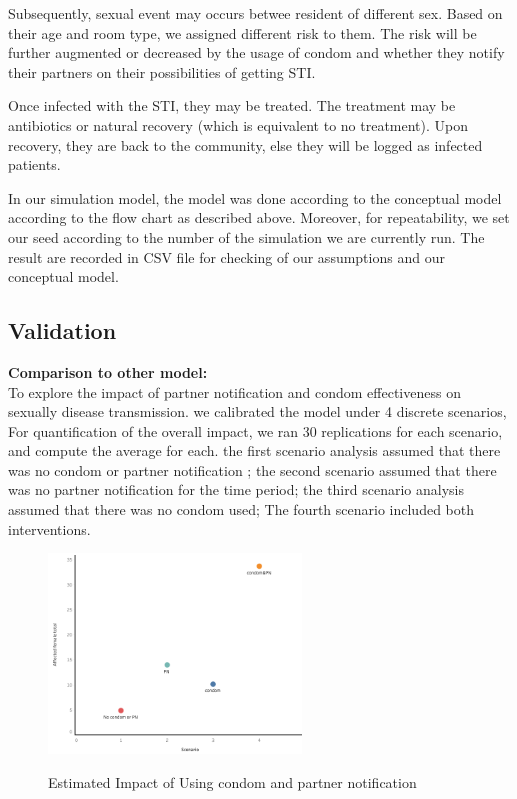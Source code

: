 \documentclass{article}
\begin{document}
\begin{normalsize}
Subsequently, sexual event may occurs betwee resident of different sex. Based on their age and room type, we assigned different risk to them. The risk will be further augmented or decreased by the usage of condom and whether they notify their partners on their possibilities of getting STI.

Once infected with the STI, they may be treated. The treatment may be antibiotics or natural recovery (which is equivalent to no treatment). Upon recovery, they are back to the community, else they will be logged as infected patients.

In our simulation model, the model was done according to the conceptual model according to the flow chart as described above. Moreover, for repeatability, we set our seed according to the number of the simulation we are currently run. The result are recorded in CSV file for checking of our assumptions and our conceptual model. 

\subsection{Validation}
\textbf{Comparison to other model:}\\

To explore the impact of partner notification and condom effectiveness on sexually disease transmission. we calibrated the model under 4 discrete scenarios, For quantification of the overall impact, we ran 30 replications for each scenario, and compute the average for each. the first scenario analysis assumed that there was no condom or partner notification ; the second scenario assumed that there was no partner notification for the time period; the third scenario analysis assumed that there was no condom used; The fourth scenario included both interventions.\\


\begin{figure}[H]
\caption{Estimated Impact of Using condom and partner notification}
\centering
\includegraphics[width=0.6\textwidth]{plt1.png}
\label{fig:plt1}
\end{figure}


\end{normalsize}
\end{document}
